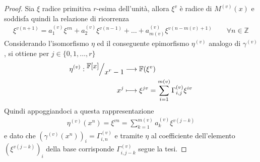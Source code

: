 \begin{proof}
   Sia $\xi$ radice primitiva $r$-esima dell'unità, allora $\xi^{v}$ è radice di $M^{(v)}(x)$ e soddisfa quindi la relazione di ricorrenza
   \begin{align*}
      \xi^{v(n+1)} = a_{1}^{(v)}\xi^{vn} + a_{2}^{(v)}\xi^{v(n-1)} + \dots  + a_{m(v)}^{(v)}\xi^{v(n-m(v)+1)}
      \qquad
      \forall n \in \mathbb{Z}
   \end{align*}
   Considerando l'isomorfismo $\eta$ ed il conseguente epimorfismo $\eta^{(v)}$ analogo di $\gamma^{(v)}$, si ottiene per $j \in \lbrace  0,1, \dots, r \rbrace$
   \begin{align*}
        \eta^{(v)} :  \quotient{\mathbb{F} \lbrack x \rbrack  }{x^{r} - 1}
      & \longrightarrow
       \mathbb{F} (\xi^{v})   \\
      x^{j} &\longmapsto  \xi^{jv} = \sum_{i=1}^{m(v)} \Gamma_{i,j}^{(v)}\xi^{iv}
   \end{align*}
   Quindi appoggiandoci a questa rappresentazione
   \begin{align*}
      \eta^{(v)}(x^n) = \xi^{vn} = \sum_{k=1}^{m(v)}a_{k}^{(v)}\xi^{v(j-k)}
   \end{align*}
   e dato che $(\gamma^{(v)}(x^{n}))_{i} = \Gamma_{i,n}^{(v)}$ e tramite $\eta$ al coefficiente dell'elemento $(\xi^{v(j-k)})_{i}$ della base corrisponde $\Gamma_{i,j-k}^{(v)}$ segue la tesi.
\end{proof}

